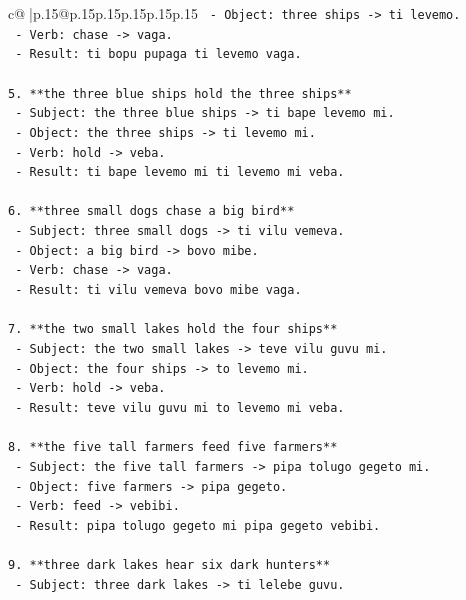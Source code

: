 \documentclass{article}
\begin{document}
{\begin{supertabular}{c@{$\;$}|p{.15\linewidth}@{}p{.15\linewidth}p{.15\linewidth}p{.15\linewidth}p{.15\linewidth}p{.15\linewidth}}
{{{\texttt{    {-} Object: three ships {-}> ti levemo.} \\
\texttt{    {-} Verb: chase {-}> vaga.} \\
\texttt{    {-} Result: ti bopu pupaga ti levemo vaga.} \\
\\ 
\texttt{5.  **the three blue ships hold the three ships**} \\
\texttt{    {-} Subject: the three blue ships {-}> ti bape levemo mi.} \\
\texttt{    {-} Object: the three ships {-}> ti levemo mi.} \\
\texttt{    {-} Verb: hold {-}> veba.} \\
\texttt{    {-} Result: ti bape levemo mi ti levemo mi veba.} \\
\\ 
\texttt{6.  **three small dogs chase a big bird**} \\
\texttt{    {-} Subject: three small dogs {-}> ti vilu vemeva.} \\
\texttt{    {-} Object: a big bird {-}> bovo mibe.} \\
\texttt{    {-} Verb: chase {-}> vaga.} \\
\texttt{    {-} Result: ti vilu vemeva bovo mibe vaga.} \\
\\ 
\texttt{7.  **the two small lakes hold the four ships**} \\
\texttt{    {-} Subject: the two small lakes {-}> teve vilu guvu mi.} \\
\texttt{    {-} Object: the four ships {-}> to levemo mi.} \\
\texttt{    {-} Verb: hold {-}> veba.} \\
\texttt{    {-} Result: teve vilu guvu mi to levemo mi veba.} \\
\\ 
\texttt{8.  **the five tall farmers feed five farmers**} \\
\texttt{    {-} Subject: the five tall farmers {-}> pipa tolugo gegeto mi.} \\
\texttt{    {-} Object: five farmers {-}> pipa gegeto.} \\
\texttt{    {-} Verb: feed {-}> vebibi.} \\
\texttt{    {-} Result: pipa tolugo gegeto mi pipa gegeto vebibi.} \\
\\ 
\texttt{9.  **three dark lakes hear six dark hunters**} \\
\texttt{    {-} Subject: three dark lakes {-}> ti lelebe guvu.} \\
}}}
\end{supertabular}}
\end{document}
